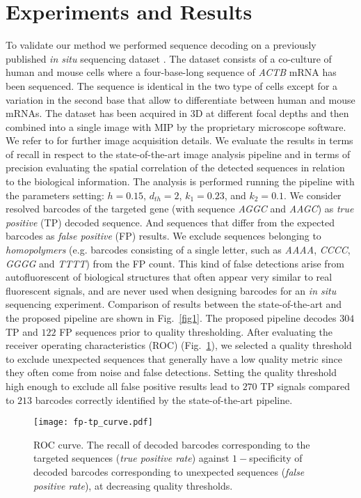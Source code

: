 \documentclass[10pt,journal]{IEEEtran}
\begin{document}
\section{Experiments and Results}
To validate our method we performed sequence decoding on a previously published \textit{in situ} sequencing dataset \cite{ke2013situ}. The dataset consists of a co-culture of human and mouse cells where a four-base-long sequence of \textit{ACTB} mRNA has been sequenced. The sequence is identical in the two type of cells except for a variation in the second base that allow to differentiate between human and mouse mRNAs. The dataset has been acquired in 3D at different focal depths and then combined into a single image with MIP by the proprietary microscope software. We refer to \cite{ke2013situ} for further image acquisition details.
We evaluate the results in terms of recall in respect to the state-of-the-art image analysis pipeline \cite{pacureanu2014image} and in terms of precision evaluating the spatial correlation of the detected sequences in relation to the biological information. The analysis is performed running the pipeline with the parameters setting: $h=0.15$, $d_{th}=2$, $k_1=0.23$, and $k_2=0.1$. We consider resolved barcodes of the targeted gene (with sequence \textit{AGGC} and \textit{AAGC}) as \textit{true positive} (TP) decoded sequence. And sequences that differ from the expected barcodes as \textit{false positive} (FP) results.
We exclude sequences belonging to \textit{homopolymers} (e.g. barcodes consisting of a single letter, such as \textit{AAAA}, \textit{CCCC}, \textit{GGGG} and \textit{TTTT}) from the FP count. This kind of false detections arise from autofluorescent of biological structures that often appear very similar to real fluorescent signals, and are never used when designing barcodes for an \textit{in situ} sequencing experiment.
Comparison of results between the state-of-the-art and the proposed pipeline are shown in Fig.~\ref{fig1}. The proposed pipeline decodes $304$ TP and $122$ FP sequences prior to quality thresholding. %
After evaluating the receiver operating characteristics (ROC) (Fig.~\ref{TPFP}), we selected a quality threshold to exclude unexpected sequences that generally have a low quality metric since they often come from noise and false detections. Setting the quality threshold high enough to exclude all false positive results lead to $270$ TP signals compared to $213$ barcodes correctly identified by the state-of-the-art pipeline.

\begin{figure}[t]
\centering
\texttt{[image: fp-tp\_curve.pdf]}
\caption{ROC curve. The recall of decoded barcodes corresponding to the targeted sequences (\textit{true positive rate}) against $1-$specificity of decoded barcodes corresponding to unexpected sequences (\textit{false positive rate}), at decreasing quality thresholds.}
\label{TPFP}
\end{figure}
\end{document}
